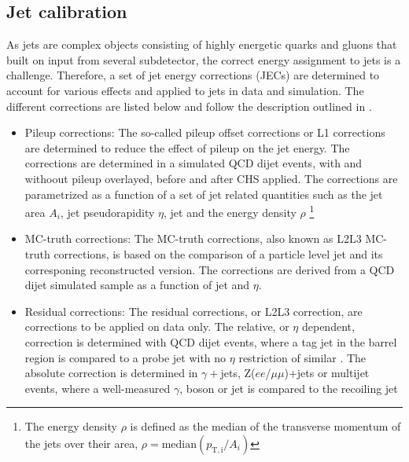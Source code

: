 \subsection{Jet calibration}\label{sec:JEC}
As jets are complex objects consisting of highly energetic quarks and gluons that built on input from several subdetector, the correct energy assignment to jets is a challenge. 
Therefore, a set of jet energy corrections (JECs) are determined to account for various effects and applied to jets in data and simulation. 
The different corrections are listed below and follow the description outlined in \cite{Khachatryan:2016kdb}. 
\begin{itemize}
\item Pileup corrections:
The so-called pileup offset corrections or L1 corrections are determined to reduce the effect of pileup on the jet energy. 
The corrections are determined in a simulated QCD dijet events, with and withoout pileup overlayed, before and after CHS applied. 
The corrections are parametrized as a function of a set of jet related quantities such as the jet area $A_{i}$, jet pseudorapidity $\eta$, jet \pt and the energy density $\rho$ \footnote{The energy density $\rho$ is defined as the median of the transverse momentum of the jets over their area, $\rho=\mathrm{median}(p_{\mathrm{T,i}}/ A_{i})$ } 
\item MC-truth corrections: 
The MC-truth corrections, also known as L2L3 MC-truth corrections, is based on the comparison of a particle level jet and its corresponing reconstructed version. 
The corrections are derived from a QCD dijet simulated sample as a function of jet \pt and $\eta$. 
\item Residual corrections:
The residual corrections, or L2L3 correction, are corrections to be applied on data only. 
The relative, or $\eta$ dependent, correction is determined with QCD dijet events, where a tag jet in the barrel region is compared to a probe jet with no $\eta$ restriction of similar \pt. 
The absolute correction is determined in $\gamma+$jets, Z($ee$/$\mu\mu$)+jets or multijet events, where a well-measured $\gamma$, \PZ boson or jet is compared to the recoiling jet 
\end{itemize}  
